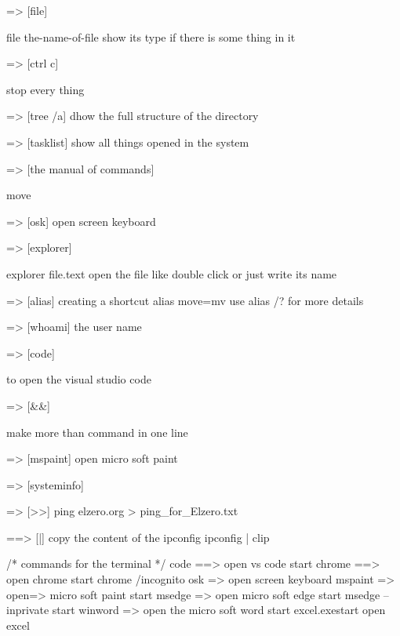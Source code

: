 =>  [file] 

file the-name-of-file 
show its type if there is some thing in it 

=> [ctrl c]

stop every thing 

=> [tree /a] 
dhow the full structure of the directory 

=> [tasklist]
show all things opened in the system 

=> [the manual of commands]

move \?

=> [osk]  open screen keyboard 

=> [explorer]

explorer file.text 
open the file like double click 
or just write its name 

=>  [alias] 
creating a shortcut 
alias move=mv 
use 
alias /? 
for more details

=> [whoami]
the user name 

=> [code] 

to open the visual studio code 

=> [&&]

make more than command in one line 

=> [mspaint] 
open micro soft paint 

=> [systeminfo]

=> [>>]
ping elzero.org > ping_for_Elzero.txt 

==> [|]
copy the content of the ipconfig 
ipconfig | clip 



/* commands for the terminal */
code  ==> open vs code 
start chrome  ==> open chrome 
start chrome /incognito
osk  => open screen keyboard 
mspaint  => open=> micro soft paint 
start msedge  => open micro soft edge 
start msedge –inprivate 
start winword => open the micro soft word 
start excel.exestart  open excel 